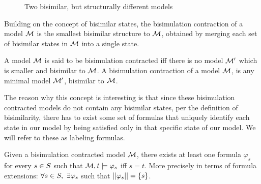 \begin{figure}[h]
	\label{fig:bisimmods}
	\centering
	\caption{Two bisimilar, but structurally different models}
\end{figure}

Building on the concept of bisimilar states, the bisimulation contraction of a model $\mathcal{M}$ is the smallest bisimilar structure to $\mathcal{M}$, obtained by merging each set of bisimilar states in $\mathcal{M}$ into a single state. 

\begin{definition}
	\label{def:bisimContract}
	A model $\mathcal{M}$ is said to be bisimulation contracted iff there is no model $\mathcal{M}'$ which is smaller and bisimilar to $\mathcal{M}$. A bisimulation contraction of a model $\mathcal{M}$, is any minimal model $\mathcal{M}'$, bisimilar to $\mathcal{M}$.
\end{definition}

The reason why this concept is interesting is that since these bisimulation contracted models do not contain any bisimilar states, per the definition of bisimilarity, there has to exist some set of formulas that uniquely identify each state in our model by being satisfied only in that specific state of our model. We will refer to these as labeling formulas.

\begin{definition}
	\label{def:label}
	Given a bisimulation contracted model $\mathcal{M}$, there exists at least one formula $\varphi_s$ for every $s\in S$ such that $\mathcal{M},t \models \varphi_s$ iff $s = t$. More precisely in terms of formula extensions: 
	\centering
	$\forall s\in S,~\exists\varphi_s$ such that $||\varphi_s|| = \{s\}$.
\end{definition}

